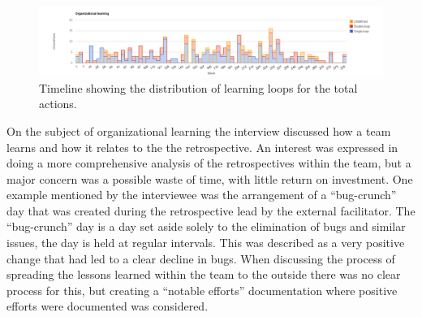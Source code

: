 \begin{table}[!h]
	\begin{center}
	\caption{Results from the content analysis regarding the organizational learning nature of the action.}
	\label{table:organizational-learning-results}
	\end{center}
\end{table}

\begin{figure}
	\centering
	\includegraphics[width=\textwidth, keepaspectratio]{figures/learning-l.png}
	\caption{Timeline showing the distribution of learning loops for the total actions.}
	\label{figure:learning-l}
\end{figure}

On the subject of organizational learning the interview discussed how a team learns and how it relates to the the retrospective. An interest was expressed in doing a more comprehensive analysis of the retrospectives within the team, but a major concern was a possible waste of time, with little return on investment. One example mentioned by the interviewee was the arrangement of a ``bug-crunch'' day that was created during the retrospective lead by the external facilitator. The ``bug-crunch'' day is a day set aside solely to the elimination of bugs and similar issues, the day is held at regular intervals. This was described as a very positive change that had led to a clear decline in bugs. When discussing the process of spreading the lessons learned within the team to the outside there was no clear process for this, but creating a ``notable efforts'' documentation where positive efforts were documented was considered. 

